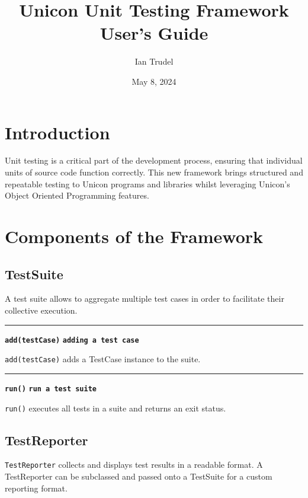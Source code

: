 \documentclass[letterpaper,12pt]{article}
\title{Unicon Unit Testing Framework\\ User's Guide}
\author{Ian Trudel}
\date{May 8, 2024}
\begin{document}
\maketitle

\section{Introduction}
Unit testing is a critical part of the development process, ensuring that individual units of source code function correctly. This new framework brings structured and repeatable testing to Unicon programs and libraries whilst leveraging Unicon's Object Oriented Programming features.

\section{Components of the Framework}
\subsection{TestSuite}
A test suite allows to aggregate multiple test cases in order to facilitate their collective execution.

\bigskip
\hrule\vspace{0.1cm}
\noindent
{\tt\bf add(testCase)} \hfill {\tt\bf adding a test case}

\vspace{0.1cm}
\noindent
\texttt{add(testCase)} adds a TestCase instance to the suite.

\bigskip
\hrule\vspace{0.1cm}
\noindent
{\tt\bf run()} \hfill {\tt\bf run a test suite}

\vspace{0.1cm}
\noindent
\texttt{run()} executes all tests in a suite and returns an exit status.


\subsection{TestReporter}

\texttt{TestReporter} collects and displays test results in a readable format. A TestReporter can be subclassed and passed onto a TestSuite for a custom reporting format.
\end{document}
